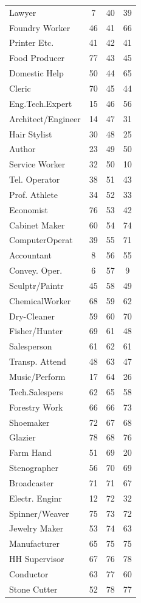 \begin{tabular}{lccc}
Lawyer&7&40&39\\
Foundry Worker&46&41&66\\
Printer Etc.&41&42&41\\
Food Producer&77&43&45\\
Domestic Help&50&44&65\\
Cleric&70&45&44\\
Eng.Tech.Expert&15&46&56\\
Architect/Engineer&14&47&31\\
Hair Stylist&30&48&25\\
Author&23&49&50\\
Service Worker&32&50&10\\
Tel. Operator&38&51&43\\
Prof. Athlete&34&52&33\\
Economist&76&53&42\\
Cabinet Maker&60&54&74\\
ComputerOperat&39&55&71\\
Accountant&8&56&55\\
Convey. Oper.&6&57&9\\
Sculptr/Paintr&45&58&49\\
ChemicalWorker&68&59&62\\
Dry-Cleaner&59&60&70\\
Fisher/Hunter&69&61&48\\
Salesperson&61&62&61\\
Transp. Attend&48&63&47\\
Music/Perform&17&64&26\\
Tech.Salespers&62&65&58\\
Forestry Work&66&66&73\\
Shoemaker&72&67&68\\
Glazier&78&68&76\\
Farm Hand&51&69&20\\
Stenographer&56&70&69\\
Broadcaster&71&71&67\\
Electr. Enginr&12&72&32\\
Spinner/Weaver&75&73&72\\
Jewelry Maker&53&74&63\\
Manufacturer&65&75&75\\
HH Supervisor&67&76&78\\
Conductor&63&77&60\\
Stone Cutter&52&78&77\\
\hline\hline
\end{tabular}
